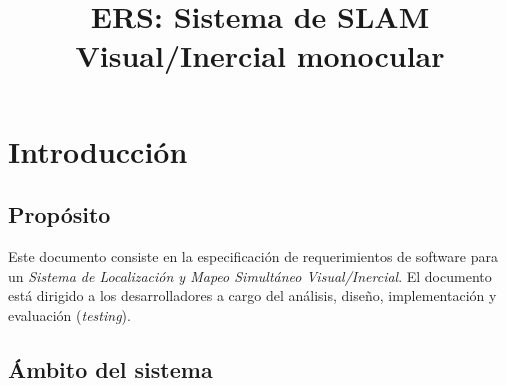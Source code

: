 \documentclass[12pt,a4paper, twosite]{article}
\date{}
\title{ERS: Sistema de SLAM Visual/Inercial monocular}
\begin{document}
\maketitle
\tableofcontents

\newpage

\section{Introducción}
\label{sec:org60390fa}



\subsection{Propósito}
\label{sec:org434c3ef}


Este documento consiste en la especificación de requerimientos de software para un
\textit{Sistema de Localización y Mapeo Simultáneo Visual/Inercial}.
El documento está dirigido a los desarrolladores a cargo del análisis, diseño,
implementación y evaluación (\textit{testing}).

\subsection{Ámbito del sistema}
\label{sec:org12e44a1}





\end{document}
